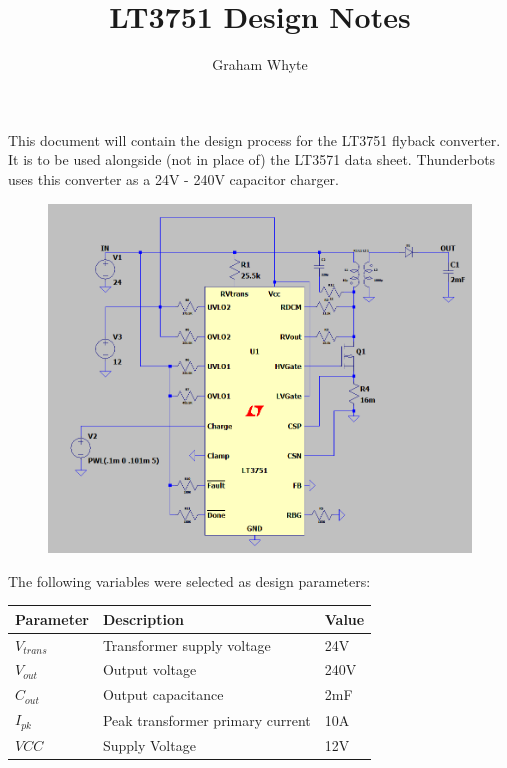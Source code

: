 \documentclass{article}
\title{LT3751 Design Notes}
\author{Graham Whyte}
\begin{document}
	\maketitle
	\noindent This document will contain the design process for the LT3751 flyback converter. It is to be used alongside (not in place of) the LT3571 data sheet. Thunderbots uses this converter as a 24V - 240V capacitor charger. \\
	
	\begin{figure}[h!]
		\includegraphics[width=\linewidth]{LT3571_Tbots_Configuration.png}
	\end{figure}
	
	\noindent The following variables were selected as design parameters:
	
	\begin{table}[h]
		\centering
		\begin{tabular}{lll}
			\textbf{Parameter}   & \textbf{Description}                      & \textbf{Value} \\
			\hline
			$V_{trans}$ & Transformer supply voltage       & 24V   \\
			$V_{out}$   & Output voltage                   & 240V  \\
			$C_{out}$   & Output capacitance               & 2mF   \\
			$I_{pk}$    & Peak transformer primary current & 10A  \\
			$VCC$		& Supply Voltage				   & 12V
		\end{tabular}
		\centering
	\end{table}
	
\end{document}
